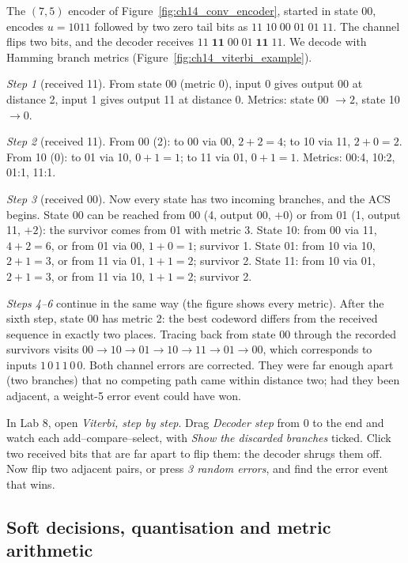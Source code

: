 \begin{worked}
The $(7,5)$ encoder of Figure~\ref{fig:ch14_conv_encoder}, started in state 00, encodes $u=1011$
followed by two zero tail bits as $11\;10\;00\;01\;01\;11$. The channel flips two bits, and the decoder
receives $11\;\mathbf{11}\;00\;01\;\mathbf{11}\;11$. We decode with Hamming branch metrics
(Figure~\ref{fig:ch14_viterbi_example}).

\emph{Step 1} (received 11). From state 00 (metric 0), input 0 gives output 00 at distance 2, input 1 gives
output 11 at distance 0. Metrics: state 00 $\to2$, state 10 $\to0$.

\emph{Step 2} (received 11). From 00 (2): to 00 via 00, $2+2=4$; to 10 via 11, $2+0=2$. From 10 (0): to 01
via 10, $0+1=1$; to 11 via 01, $0+1=1$. Metrics: 00:4, 10:2, 01:1, 11:1.

\emph{Step 3} (received 00). Now every state has two incoming branches, and the ACS begins. State 00 can be
reached from 00 (4, output 00, $+0$) or from 01 (1, output 11, $+2$): the survivor comes from 01 with
metric 3. State 10: from 00 via 11, $4+2=6$, or from 01 via 00, $1+0=1$; survivor 1. State 01: from 10
via 10, $2+1=3$, or from 11 via 01, $1+1=2$; survivor 2. State 11: from 10 via 01, $2+1=3$, or from 11
via 10, $1+1=2$; survivor 2.

\emph{Steps 4--6} continue in the same way (the figure shows every metric). After the sixth step, state
00 has metric 2: the best codeword differs from the received sequence in exactly two places. Tracing back
from state 00 through the recorded survivors visits $00\to10\to01\to10\to11\to01\to00$, which
corresponds to inputs $1\,0\,1\,1\,0\,0$. Both channel errors are corrected. They were far enough apart
(two branches) that no competing path came within distance two; had they been adjacent, a weight-5 error
event could have won.
\end{worked}

\begin{tryit}
In Lab 8, open \emph{Viterbi, step by step}. Drag \emph{Decoder step} from 0 to the end and watch each
add--compare--select, with \emph{Show the discarded branches} ticked. Click two received bits that are
far apart to flip them: the decoder shrugs them off. Now flip two adjacent pairs, or press \emph{3
random errors}, and find the error event that wins.
\end{tryit}

\subsection{Soft decisions, quantisation and metric arithmetic}

